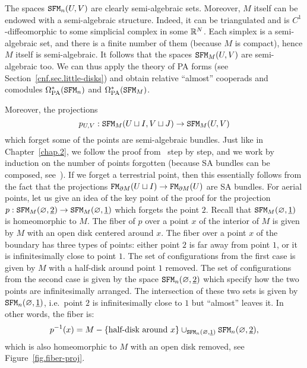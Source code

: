 The spaces $\mathtt{SFM}_{n}(U,V)$ are clearly semi-algebraic sets.
Moreover, $M$ itself can be endowed with a semi-algebraic structure.
Indeed, it can be triangulated and is $C^{1}$-diffeomorphic to some simplicial complex in some $\mathbb{R}^{N}$.
Each simplex is a semi-algebraic set, and there is a finite number of them (because $M$ is compact), hence $M$ itself is semi-algebraic.
It follows that the spaces $\mathtt{SFM}_{M}(U,V)$ are semi-algebraic too.
We can thus apply the theory of PA forms (see Section~\ref{cnf.sec.little-disks}) and obtain relative ``almost'' cooperads and comodules $\Omega_{\mathrm{PA}}^{*}(\mathtt{SFM}_{n})$ and $\Omega_{\mathrm{PA}}^{*}(\mathtt{SFM}_{M})$.

Moreover, the projections
\begin{equation}
  p_{U,V} : \mathtt{SFM}_{M}(U \sqcup I, V \sqcup J) \to \mathtt{SFM}_{M}(U,V)
\end{equation}
which forget some of the points are semi-algebraic bundles.
Just like in Chapter~\ref{chap.2}, we follow the proof from~\cite[Section~5.9]{LambrechtsVolic2014} step by step, and we work by induction on the number of points forgotten (because SA bundles can be composed, see~\cite[Proposition~8.5]{HardtLambrechtsTurchinVolic2011}).
If we forget a terrestrial point, then this essentially follows from the fact that the projections $\mathtt{FM}_{\partial M}(U \sqcup I) \to \mathtt{FM}_{\partial M}(U)$ are SA bundles.
For aerial points, let us give an idea of the key point of the proof for the projection $p : \mathtt{SFM}_{M}(\varnothing, \underline{2}) \to \mathtt{SFM}_{M}(\varnothing, \underline{1})$ which forgets the point $2$.
Recall that $\mathtt{SFM}_{M}(\varnothing, \underline{1})$ is homeomorphic to $M$.
The fiber of $p$ over a point $x$ of the interior of $M$ is given by $M$ with an open disk centered around $x$.
The fiber over a point $x$ of the boundary has three types of points: either point $2$ is far away from point $1$, or it is infinitesimally close to point $1$.
The set of configurations from the first case is given by $M$ with a half-disk around point $1$ removed.
The set of configurations from the second case is given by the space $\mathtt{SFM}_{n}(\varnothing, \underline{2})$ which specify how the two points are infinitesimally arranged.
The intersection of these two sets is given by $\mathtt{SFM}_{n}(\varnothing, \underline{1})$, i.e.\ point $2$ is infinitesimally close to $1$ but ``almost'' leaves it.
In other words, the fiber is:
\begin{equation}
  p^{-1}(x) = M - \{ \text{half-disk around } x\} \cup_{\mathtt{SFM}_{n}(\varnothing,\underline{1})} \mathtt{SFM}_{n}(\varnothing, \underline{2}),
\end{equation}
which is also homeomorphic to $M$ with an open disk removed, see Figure~\ref{fig.fiber-proj}.

